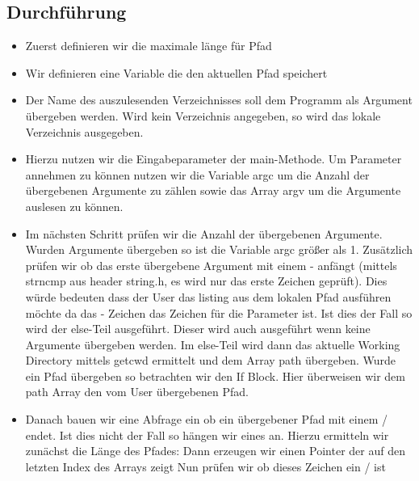 \subsection{Durchführung}
\begin{itemize}
	\item Zuerst definieren wir die maximale länge für Pfad 
\item Wir definieren eine Variable die den aktuellen Pfad speichert 
	\item Der Name des auszulesenden Verzeichnisses soll dem Programm als Argument übergeben
 werden. Wird kein Verzeichnis angegeben, so wird das lokale Verzeichnis ausgegeben.

 \item Hierzu nutzen wir die Eingabeparameter der main-Methode.\newline
   Um Parameter annehmen zu können
 nutzen wir die Variable argc um die Anzahl der übergebenen Argumente
 zu zählen sowie das Array argv um die Argumente auslesen zu können.
\item Im nächsten Schritt prüfen wir die Anzahl der übergebenen
Argumente.
\newline
{}
\newline
Wurden Argumente übergeben so ist die Variable argc größer als 1.
Zusätzlich prüfen wir ob das erste übergebene Argument mit einem - anfängt
(mittels strncmp aus header string.h, es wird nur das erste Zeichen geprüft).
Dies würde bedeuten dass der User das listing aus dem lokalen Pfad ausführen
möchte da das - Zeichen das Zeichen für die Parameter ist.
Ist dies der Fall so wird der else-Teil ausgeführt. Dieser wird auch ausgeführt
wenn keine Argumente übergeben werden.
 Im else-Teil wird dann das aktuelle
Working Directory mittels getcwd ermittelt und dem Array path übergeben.
Wurde ein Pfad übergeben so betrachten wir den If Block.
 Hier überweisen wir dem path Array den vom
User übergebenen Pfad.
\item Danach bauen wir eine Abfrage ein ob ein übergebener Pfad mit einem
/ endet. Ist dies nicht der Fall so hängen wir eines an.
Hierzu ermitteln wir zunächst die Länge des Pfades:
Dann erzeugen wir einen Pointer der auf den letzten Index des Arrays
zeigt 
Nun prüfen wir ob dieses Zeichen ein / ist

\end{itemize}

